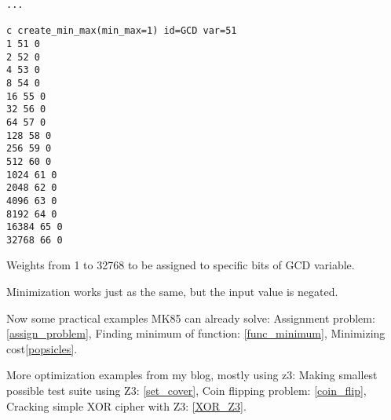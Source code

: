 \begin{lstlisting}
...

c create_min_max(min_max=1) id=GCD var=51
1 51 0
2 52 0
4 53 0
8 54 0
16 55 0
32 56 0
64 57 0
128 58 0
256 59 0
512 60 0
1024 61 0
2048 62 0
4096 63 0
8192 64 0
16384 65 0
32768 66 0
\end{lstlisting}

Weights from 1 to 32768 to be assigned to specific bits of \ac{GCD} variable.

Minimization works just as the same, but the input value is negated.

Now some practical examples MK85 can already solve:
Assignment problem: \ref{assign_problem},
Finding minimum of function: \ref{func_minimum},
Minimizing cost\ref{popsicles}.

More optimization examples from my blog, mostly using z3:
Making smallest possible test suite using Z3: \ref{set_cover},
Coin flipping problem: \ref{coin_flip},
Cracking simple XOR cipher with Z3: \ref{XOR_Z3}.

